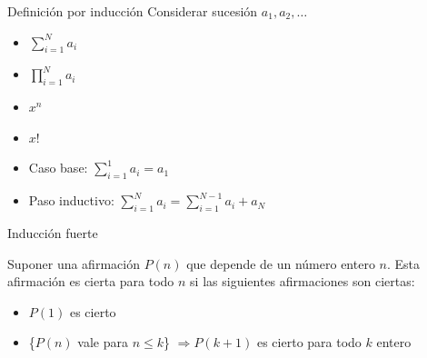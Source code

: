 \documentclass[14pt,aspectratio=169,xcolor=dvipsnames]{beamer}
\begin{document}
\begin{frame}{Definición por inducción}
    Considerar sucesión $a_1, a_2, \hdots$
    \begin{itemize}
        \item  $\sum_{i=1}^N a_i$
        \item $ \prod_{i=1}^N a_i$
        \item $x^n$
        \item $x!$
    \end{itemize}
    \pause
    \begin{center}
    \begin{minipage}{0.6\textwidth}
    \begin{block}{}
        \begin{itemize}
            \item Caso base: $\sum_{i=1}^1 a_i = a_1$
            \item Paso inductivo: $\sum_{i=1}^N a_i = \sum_{i=1}^{N-1} a_i + a_N$
        \end{itemize}
    \end{block}
    \end{minipage}
    \end{center}
\end{frame}
\begin{frame}{Inducción fuerte}
    \begin{block}{}
        Suponer una afirmación $P(n)$ que depende de un número entero $n$. Esta afirmación es cierta para todo $n$ si las siguientes afirmaciones son ciertas:
        \begin{itemize}
            \item $P(1)$ es cierto 
            \item \{$P(n)$ vale para $n\leq k$\} $\Rightarrow P(k+1)$ es cierto para todo $k$ entero
        \end{itemize}
    \end{block}

\end{frame}
\begin{frame}
    \maketitle
\end{frame}
\end{document}
